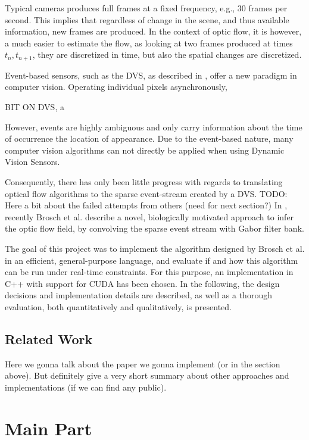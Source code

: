 \documentclass[a4paper,twoside, openright,12pt]{report}
\begin{document}
Typical cameras produces full frames at a fixed frequency, e.g., 30 frames per second.
This implies that regardless of change in the scene, and thus available information, new frames are produced.
In the context of optic flow, it is however, a much easier to estimate the flow, as looking at two frames produced at times $t_n,t_{n+1}$, they are discretized in time, but also the spatial changes are discretized.

Event-based sensors, such as the DVS, as described in \cite{Delbruck}, offer a new paradigm in computer vision. Operating individual pixels asynchronously, 

BIT ON DVS, a

However, events are highly ambiguous and only carry information about the time of occurrence the location of appearance.
Due to the event-based nature, many computer vision algorithms can not directly be applied when using Dynamic Vision Sensors.

Consequently, there has only been little progress with regards to translating optical flow algorithms to the sparse event-stream created by a DVS.
TODO: Here a bit about the failed attempts from others (need for next section?)
In \cite{Brosch2015}, recently Brosch et al. describe a novel, biologically motivated approach to infer the optic flow field, by convolving the sparse event stream with Gabor filter bank.

The goal of this project was to implement the algorithm designed by Brosch et al. in an efficient, general-purpose language, and evaluate if and how this algorithm can be run under real-time constraints.
For this purpose, an implementation in C++ with support for CUDA has been chosen.
In the following, the design decisions and implementation details are described, as well as a thorough evaluation, both quantitatively and qualitatively, is presented.

\section{Related Work}

Here we gonna talk about the paper we gonna implement (or in the section above).
But definitely give a very short summary about other approaches and implementations (if we can find any public).




\chapter{Main Part}
\end{document}
